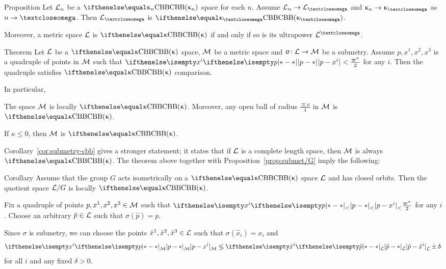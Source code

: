 \begin{thm}{Proposition}\label{prp:A^omega}
Let $\mathcal{L}_n$ be a $\Alex{\kappa_n}$ space for each $n$.
Assume $\spc{L}_n\to \spc{L}_\o$ 
and $\kappa_n\to\kappa_\o$ as $n\to\o$.
Then $\spc{L}_\o$ is $\Alex{\kappa_\o}$.

Moreover, a metric space $\mathcal{L}$ is $\Alex\kappa$ if and only if so is
its ultrapower $\spc{L}^\o$.
\end{thm}

\begin{thm}{Theorem}\label{thm:submetry-CBB}
Let $\mathcal{L}$ be a $\Alex{\kappa}$ space, $\mathcal{M}$ be a metric space and $\sigma\:\spc{L}\to\spc{M}$ be a submetry.
Assume $p,x^1,x^2,x^3$ is a quadruple of points in $\mathcal{M}$ such that 
$\dist{p}{x^i}{}<\tfrac{\varpi\kappa}2$ for any $i$.
Then the  quadruple satisfies $\Alex{\kappa}$ comparison.

In particular, 
\begin{subthm}{}
The space $\mathcal{M}$ is locally $\Alex{\kappa}$.
Moreover, any open ball of radius $\tfrac{\varpi\kappa}4$ in $\mathcal{M}$ is $\Alex{\kappa}$.
\end{subthm}

\begin{subthm}{}
If $\kappa\le 0$, then  $\mathcal{M}$ is $\Alex{\kappa}$.
\end{subthm}
\end{thm}

Corollary~\ref{cor:submetry-cbb} gives a stronger statement; it states that if $\mathcal{L}$ is a complete length space, then $\mathcal{M}$ is always $\Alex{\kappa}$.
The theorem above together with Proposition~\ref{prop:submet/G}
imply the following:

\begin{thm}{Corollary}\label{thm:CBB/G}
Assume that  the group $G$ acts isometrically on a $\Alex{\kappa}$ space $\mathcal{L}$ and has  closed orbits.
Then the quotient space $\mathcal{L}/G$ is locally $\Alex\kappa$. 
\end{thm}

Fix a quadruple of points $p,x^1,x^2,x^3\in \spc{M}$ such that 
$\dist{p}{x^i}<\tfrac{\varpi\kappa}2$ for any $i$.
Choose an arbitrary $\hat p\in \spc{L}$ such that $\sigma(\hat{p})=p$.

Since $\sigma$ is submetry, we can choose the points $\hat{x}^1,\hat{x}^2,\hat{x}^3\in \spc{L}$ such that $\sigma(\hat x_i)=x_i$ and
\[\dist{p}{x^i}{\spc{M}}
\lege
\dist{\hat{p}}{\hat{x}^i}{\spc{L}}
\pm\delta\]
for all $i$ and any fixed $\delta>0$.

